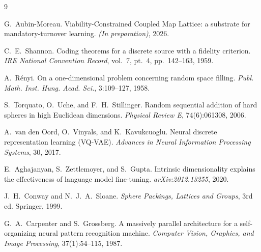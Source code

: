 \documentclass[11pt]{article}
\begin{document}

\begin{thebibliography}{9}

G.~Aubin-Moreau.
Viability-Constrained Coupled Map Lattice: a substrate for mandatory-turnover learning.
\textit{(In preparation)}, 2026.

C.~E.~Shannon.
Coding theorems for a discrete source with a fidelity criterion.
\textit{IRE National Convention Record}, vol.~7, pt.~4, pp.~142--163, 1959.

A.~R\'enyi.
On a one-dimensional problem concerning random space filling.
\textit{Publ. Math. Inst. Hung. Acad. Sci.}, 3:109--127, 1958.

S.~Torquato, O.~Uche, and F.~H.~Stillinger.
Random sequential addition of hard spheres in high Euclidean dimensions.
\textit{Physical Review E}, 74(6):061308, 2006.

A.~van den Oord, O.~Vinyals, and K.~Kavukcuoglu.
Neural discrete representation learning (VQ-VAE).
\textit{Advances in Neural Information Processing Systems}, 30, 2017.

E.~Aghajanyan, S.~Zettlemoyer, and S.~Gupta.
Intrinsic dimensionality explains the effectiveness of language model fine-tuning.
\textit{arXiv:2012.13255}, 2020.

J.~H.~Conway and N.~J.~A.~Sloane.
\textit{Sphere Packings, Lattices and Groups}, 3rd ed.
Springer, 1999.

G.~A.~Carpenter and S.~Grossberg.
A massively parallel architecture for a self-organizing neural pattern recognition machine.
\textit{Computer Vision, Graphics, and Image Processing}, 37(1):54--115, 1987.

\end{thebibliography}
\end{document}
